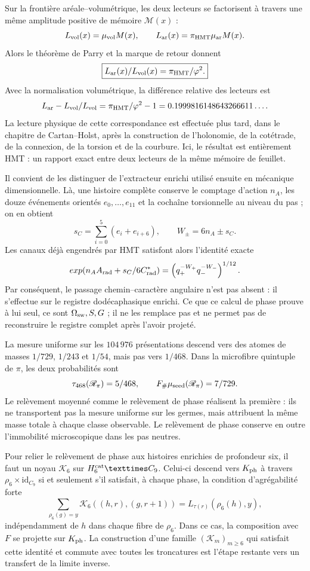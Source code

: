 Sur la frontière aréale--volumétrique, les deux lecteurs se factorisent à travers
une même amplitude positive de mémoire \(\mathcal M(x)\) :
\[
 \mathcal L_{\rm vol}(x)=\mu_{\rm vol}\mathcal M(x),
 \qquad
 \mathcal L_{\rm ar}(x)=
 \pi_{\rm HMT}\mu_{\rm ar}\mathcal M(x).
\]
Alors le théorème de Parry et la marque de retour donnent
\[
 \boxed{\displaystyle
 \frac{\mathcal L_{\rm ar}(x)}
 {\mathcal L_{\rm vol}(x)}
 =\frac{\pi_{\rm HMT}}{\varphi^2}.}
\]
Avec la normalisation volumétrique, la différence relative des lecteurs est
\[
 \frac{\mathcal L_{\rm ar}-\mathcal L_{\rm vol}}
 {\mathcal L_{\rm vol}}
 =
 \frac{\pi_{\rm HMT}}{\varphi^2}-1
 =
 0.1999816148643266611\ldots.
\]
La lecture physique de cette correspondance est effectuée plus tard, dans le chapitre de
Cartan--Holst, après la construction de l'holonomie, de la cotétrade, de la connexion, de la torsion
et de la courbure. Ici, le résultat est entièrement HMT : un rapport exact entre
deux lecteurs de la même mémoire de feuillet.

Il convient de les distinguer de l'extracteur enrichi utilisé ensuite en
mécanique dimensionnelle. Là, une histoire complète conserve le comptage d'action
\(n_A\), les douze événements orientés \(e_0,\ldots,e_{11}\) et la cochaîne
torsionnelle au niveau du pas ; on en obtient
\[
 s_C=\sum_{i=0}^{5}(e_i+e_{i+6}),
 \qquad
 W_\pm=6n_A\pm s_C.
\]
Les canaux déjà engendrés par HMT satisfont alors l'identité exacte
\[
 \exp\!\left(n_AA_{\rm rad}+\frac{s_C}{6}C^\ast_{\rm rad}\right)
 =\left(q_+^{-W_+}q_-^{-W_-}\right)^{1/12}.
\]
Par conséquent, le passage chemin--caractère angulaire n'est pas absent : il s'effectue sur
le registre dodécaphasique enrichi. Ce que ce calcul de phase prouve à lui
seul, ce sont \(\Omega_{\rm sw},S,G\) ; il ne les remplace pas et ne permet pas de reconstruire le
registre complet après l'avoir projeté.

La mesure uniforme sur les \(104\,976\) présentations descend vers des atomes
de masses \(1/729\), \(1/243\) et \(1/54\), mais pas vers \(1/468\). Dans la
microfibre quintuple de \(\pi\), les deux probabilités sont
\[
 \tau_{468}(\mathscr R_\pi)=\frac5{468},
 \qquad
 F_\#\mu_{\rm seed}(\mathscr R_\pi)=\frac7{729}.
\]
Le relèvement moyenné comme le relèvement de phase réalisent la première : ils ne
transportent pas la mesure uniforme sur les germes, mais attribuent la même masse
totale à chaque classe observable. Le relèvement de phase conserve en outre
l'immobilité microscopique dans les pas neutres.

Pour relier le relèvement de phase aux histoires enrichies de
profondeur six, il faut un noyau \(\mathcal K_6\) sur
\(\mathcal H_6^{\rm cat}\times C_9\). Celui-ci descend vers
\(\widehat{\mathcal K}_{\rm ph}\) à travers
\(\rho_6\times\mathrm{id}_{C_9}\) si et seulement s'il satisfait, à chaque phase, la
condition d'agrégabilité forte
\[
 \sum_{\rho_6(g)=y}\mathcal K_6((h,r),(g,r+1))
 =L_{\tau(r)}(\rho_6(h),y),
\]
indépendamment de \(h\) dans chaque fibre de \(\rho_6\). Dans ce cas,
la composition avec \(F\) se projette sur \(\mathcal K_{\rm ph}\). La construction
d'une famille \((\mathcal K_m)_{m\geq6}\) qui satisfait cette identité et
commute avec toutes les troncatures est l'étape restante vers un
transfert de la limite inverse.

